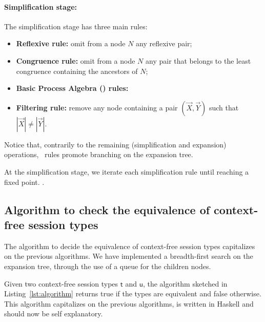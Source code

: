 \paragraph{Simplification stage:} The simplification stage has three main
 rules:
\begin{itemize}
	\item {\bf Reflexive rule:} omit from a node $N$ any reflexive pair;
	\item {\bf Congruence rule:}  omit from a node $N$ any pair that 
	      belongs to the least congruence containing the ancestors of $N$;
	\item {\bf Basic Process Algebra (\BPA) rules:} 
	\item {\bf Filtering rule:} remove any node containing a pair
	       $(\vec X, \vec Y)$ such that $|\vec X|\neq |\vec Y|$.
\end{itemize}

Notice that, contrarily to the remaining (simplification and expansion) operations, 
\BPA\ rules promote branching on the expansion tree. 

At the simplification stage, we iterate each simplification rule until reaching
a fixed point. . 

\subsection{Algorithm to check the equivalence of context-free session types}

The algorithm to decide the equivalence of context-free session 
types capitalizes on the previous algorithms. We have implemented 
a breadth-first search on the expansion tree, through the use of a 
queue for the children nodes.

Given two context-free session types $\mathsf{t}$ and $\mathsf{u}$,
the algorithm sketched in Listing~\ref{lst:algorithm} returns \textsf{true}
if the types are equivalent and \textsf{false} otherwise. 
This algorithm capitalizes on the previous algorithms, is written in Haskell 
and should now be self explanatory.

